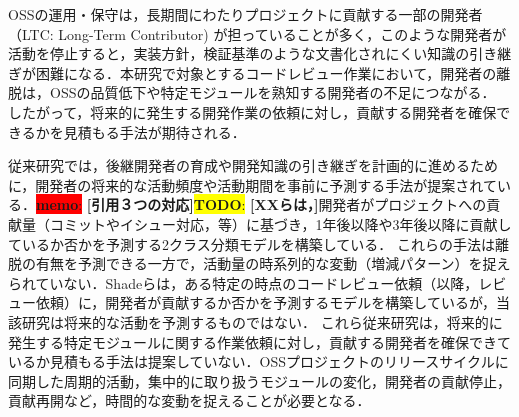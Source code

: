 \documentclass[submit,noauthor,ses,dvipdfmx]{ipsj}
\newcommand{\todo}[1]{\colorbox{yellow}{{\bf TODO}:}{\color{red} {\textbf{[#1]}}}}
\newcommand{\memo}[1]{\colorbox{red}{{\bf memo}:}{\color{blue} {\textbf{[#1]}}}}
\begin{document}
OSSの運用・保守は，長期間にわたりプロジェクトに貢献する一部の開発者（LTC: Long-Term Contributor) が担っていることが多く，このような開発者が活動を停止すると，実装方針，検証基準のような文書化されにくい知識の引き継ぎが困難になる．本研究で対象とするコードレビュー作業において，開発者の離脱は，OSSの品質低下や特定モジュールを熟知する開発者の不足につながる\cite{bacchelli}\cite{mcintosh}．
したがって，将来的に発生する開発作業の依頼に対し，貢献する開発者を確保できるかを見積もる手法が期待される．

従来研究では，後継開発者の育成や開発知識の引き継ぎを計画的に進めるために，開発者の将来的な活動頻度や活動期間を事前に予測する手法が提案されている．\memo{引用３つの対応}\todo{XXらは，}開発者がプロジェクトへの貢献量（コミットやイシュー対応，等）に基づき，1年後以降や3年後以降に貢献しているか否かを予測する2クラス分類モデルを構築している\cite{zhou}\cite{bao}\cite{constantinou}．
これらの手法は離脱の有無を予測できる一方で，活動量の時系列的な変動（増減パターン）を捉えられていない．Shadeらは，ある特定の時点のコードレビュー依頼（以降，レビュー依頼）に，開発者が貢献するか否かを予測するモデルを構築しているが，当該研究は将来的な活動を予測するものではない．
これら従来研究は，将来的に発生する特定モジュールに関する作業依頼に対し，貢献する開発者を確保できているか見積もる手法は提案していない．OSSプロジェクトのリリースサイクルに同期した周期的活動，集中的に取り扱うモジュールの変化，開発者の貢献停止，貢献再開など，時間的な変動を捉えることが必要となる．


\end{document}

